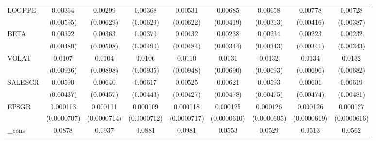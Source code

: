 \begin{table}[htbp]
\begin{tabular}{l*{8}{c}}
LOGPPE              &     0.00364         &     0.00299         &     0.00368         &     0.00531         &     0.00685         &     0.00658\sym{*}  &     0.00778\sym{*}  &     0.00728\sym{*}  \\
                    &   (0.00595)         &   (0.00629)         &   (0.00629)         &   (0.00622)         &   (0.00419)         &   (0.00313)         &   (0.00416)         &   (0.00387)         \\
BETA                &     0.00392         &     0.00363         &     0.00370         &     0.00432         &     0.00238         &     0.00234         &     0.00223         &     0.00232         \\
                    &   (0.00480)         &   (0.00508)         &   (0.00490)         &   (0.00484)         &   (0.00344)         &   (0.00343)         &   (0.00341)         &   (0.00343)         \\
VOLAT               &      0.0107         &      0.0104         &      0.0106         &      0.0110         &      0.0131\sym{*}  &      0.0132\sym{*}  &      0.0134\sym{*}  &      0.0132\sym{*}  \\
                    &   (0.00936)         &   (0.00898)         &   (0.00935)         &   (0.00948)         &   (0.00690)         &   (0.00693)         &   (0.00696)         &   (0.00682)         \\
SALESGR             &     0.00590         &     0.00640         &     0.00617         &     0.00525         &     0.00621         &     0.00593         &     0.00601         &     0.00619         \\
                    &   (0.00437)         &   (0.00457)         &   (0.00443)         &   (0.00427)         &   (0.00478)         &   (0.00475)         &   (0.00474)         &   (0.00481)         \\
EPSGR               &    0.000113         &    0.000111         &    0.000109         &    0.000118         &    0.000125\sym{*}  &    0.000126\sym{*}  &    0.000126\sym{*}  &    0.000127\sym{*}  \\
                    & (0.0000707)         & (0.0000714)         & (0.0000712)         & (0.0000717)         & (0.0000610)         & (0.0000605)         & (0.0000619)         & (0.0000616)         \\
\_cons              &      0.0878         &      0.0937         &      0.0881         &      0.0981\sym{*}  &      0.0553         &      0.0529         &      0.0513         &      0.0562         \\

\end{tabular}
\end{table}

